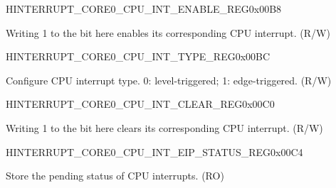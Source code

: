 \begin{register}{H}{INTERRUPT\_CORE0\_CPU\_INT\_ENABLE\_REG}{0x00B8}\label{regdesc:INTERRUPTCORE0CPUINTENABLEREG}
%
\regnewline%
\begin{regdesc}\begin{reglist}
\label{fielddesc:INTERRUPTCORE0CPUINTENABLE}\item [INTERRUPT\_CORE0\_CPU\_INT\_ENABLE] Writing 1 to the bit here enables its corresponding CPU interrupt. (R/W)
\end{reglist}\end{regdesc}
\end{register}


\begin{register}{H}{INTERRUPT\_CORE0\_CPU\_INT\_TYPE\_REG}{0x00BC}\label{regdesc:INTERRUPTCORE0CPUINTTYPEREG}
%
\regnewline%
\begin{regdesc}\begin{reglist}
\label{fielddesc:INTERRUPTCORE0CPUINTTYPE}\item [INTERRUPT\_CORE0\_CPU\_INT\_TYPE] Configure CPU interrupt type. 0: level-triggered; 1: edge-triggered. (R/W)
\end{reglist}\end{regdesc}
\end{register}


\begin{register}{H}{INTERRUPT\_CORE0\_CPU\_INT\_CLEAR\_REG}{0x00C0}\label{regdesc:INTERRUPTCORE0CPUINTCLEARREG}
%
\regnewline%
\begin{regdesc}\begin{reglist}
\label{fielddesc:INTERRUPTCORE0CPUINTCLEAR}\item [INTERRUPT\_CORE0\_CPU\_INT\_CLEAR] Writing 1 to the bit here clears its corresponding CPU interrupt. (R/W)
\end{reglist}\end{regdesc}
\end{register}


\begin{register}{H}{INTERRUPT\_CORE0\_CPU\_INT\_EIP\_STATUS\_REG}{0x00C4}\label{regdesc:INTERRUPTCORE0CPUINTEIPSTATUSREG}
%
\regnewline%
\begin{regdesc}\begin{reglist}
\label{fielddesc:INTERRUPTCORE0CPUINTEIPSTATUS}\item [INTERRUPT\_CORE0\_CPU\_INT\_EIP\_STATUS] Store the pending status of CPU interrupts. (RO)
\end{reglist}\end{regdesc}
\end{register}


